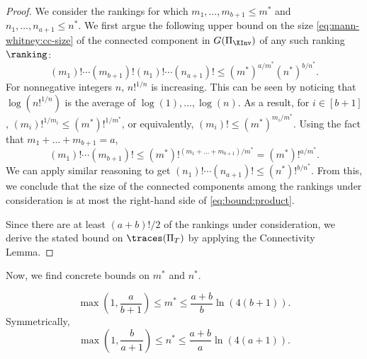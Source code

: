 \documentclass{toc}
\begin{document}
\begin{proof}
We consider the rankings for which $m_1,\dots,m_{b+1}\le m^*$ and $n_1,\dots,n_{a+1}\le n^*$. We first argue the following upper bound on the size \eqref{eq:mann-whitney:cc-size} of the connected component in $G(\Pi_{\XInv})$ of any such ranking $\ranking$:
     \begin{equation}\label{eq:bound:product}
        (m_1)!\cdots (m_{b+1})!(n_1)!\cdots (n_{a+1})! \le (m^*)^{a/m^*}(n^*)^{b/n^*}.
    \end{equation}
For nonnegative integers $n$, $n!^{1/n}$ is increasing. This can be seen by noticing that $\log(n!^{1/n})$ is the average of $\log(1),\dots,\log(n)$. As a result, for $i \in [b+1]$, $(m_i)!^{1/m_i}\le (m^*)!^{1/m^*}$, or equivalently, $(m_i)!\le (m^*)^{m_i/m^*}$. Using the fact that $m_1+\dots +m_{b+1}=a$,
    \begin{equation*}
        (m_1)!\cdots (m_{b+1})!\le (m^*)!^{(m_1+\dots+m_{b+1})/m^*}=(m^*)!^{a/m^*}.
    \end{equation*}
We can apply similar reasoning to get $(n_1)!\cdots (n_{a+1})!\le (n^*)!^{b/n^*}$. From this, we conclude that the size of the connected components among the rankings under consideration is at most the right-hand side of \eqref{eq:bound:product}. 
    
Since there are at least $(a+b)!/2$ of the rankings under consideration, we derive the stated bound on $\traces(\Pi_T)$ by applying the Connectivity Lemma.
\end{proof}

Now, we find concrete bounds on $m^*$ and $n^*$.

\begin{proposition}
    \label{prop:mann-whitney:chunk-size}
    \[\max\left(1,\frac{a}{b+1}\right)\le m^* \le \frac{a+b}{b}\ln(4(b+1)). \]
    Symmetrically,
    \[\max\left(1,\frac{b}{a+1}\right)\le n^* \le \frac{a+b}{a}\ln(4(a+1)). \]
\end{proposition}
\end{document}
